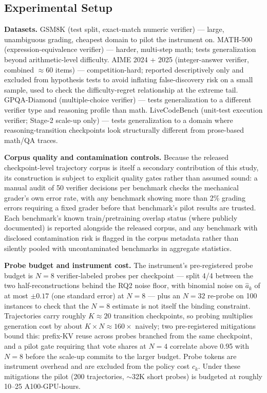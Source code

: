 \documentclass[11pt]{article}
\begin{document}
\subsection{Experimental Setup}

\textbf{Datasets.} GSM8K (test split, exact-match numeric verifier) --- large, unambiguous grading, cheapest domain to pilot the instrument on. MATH-500 (expression-equivalence verifier) --- harder, multi-step math; tests generalization beyond arithmetic-level difficulty. AIME 2024 + 2025 (integer-answer verifier, combined $\approx$60 items) --- competition-hard; reported descriptively only and excluded from hypothesis tests to avoid inflating false-discovery risk on a small sample, used to check the difficulty-regret relationship at the extreme tail. GPQA-Diamond (multiple-choice verifier) --- tests generalization to a different verifier type and reasoning profile than math. LiveCodeBench (unit-test execution verifier; Stage-2 scale-up only) --- tests generalization to a domain where reasoning-transition checkpoints look structurally different from prose-based math/QA traces.

\textbf{Corpus quality and contamination controls.} Because the released checkpoint-level trajectory corpus is itself a secondary contribution of this study, its construction is subject to explicit quality gates rather than assumed sound: a manual audit of 50 verifier decisions per benchmark checks the mechanical grader's own error rate, with any benchmark showing more than 2\% grading errors requiring a fixed grader before that benchmark's pilot results are trusted. Each benchmark's known train/pretraining overlap status (where publicly documented) is reported alongside the released corpus, and any benchmark with disclosed contamination risk is flagged in the corpus metadata rather than silently pooled with uncontaminated benchmarks in aggregate statistics.

\textbf{Probe budget and instrument cost.} The instrument's pre-registered probe budget is $N = 8$ verifier-labeled probes per checkpoint --- split 4/4 between the two half-reconstructions behind the RQ2 noise floor, with binomial noise on $\hat{a}_k$ of at most $\pm 0.17$ (one standard error) at $N = 8$ --- plus an $N = 32$ re-probe on 100 instances to check that the $N = 8$ estimate is not itself the binding constraint. Trajectories carry roughly $K \approx 20$ transition checkpoints, so probing multiplies generation cost by about $K \times N \approx 160\times$ naively; two pre-registered mitigations bound this: prefix-KV reuse across probes branched from the same checkpoint, and a pilot gate requiring that vote shares at $N = 4$ correlate above 0.95 with $N = 8$ before the scale-up commits to the larger budget. Probe tokens are instrument overhead and are excluded from the policy cost $c_k$. Under these mitigations the pilot (200 trajectories, $\sim$32K short probes) is budgeted at roughly 10--25 A100-GPU-hours.
\end{document}
